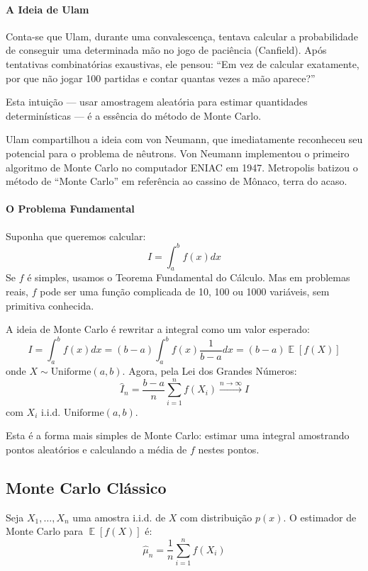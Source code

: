 \documentclass{tufte-handout}
\DeclareMathOperator{\E}{\mathbb{E}}
\begin{document}
\paragraph{A Ideia de Ulam}

Conta-se que Ulam, durante uma convalescença, tentava calcular a probabilidade de
conseguir uma determinada mão no jogo de paciência (Canfield). Após tentativas
combinatórias exaustivas, ele pensou: ``Em vez de calcular exatamente, por que não
jogar 100 partidas e contar quantas vezes a mão aparece?''

Esta intuição --- usar amostragem aleatória para estimar quantidades determinísticas ---
é a essência do método de Monte Carlo.

Ulam compartilhou a ideia com von Neumann, que imediatamente reconheceu seu potencial
para o problema de nêutrons. Von Neumann implementou o primeiro algoritmo de Monte Carlo
no computador ENIAC em 1947. Metropolis batizou o método de ``Monte Carlo'' em referência
ao cassino de Mônaco, terra do acaso.

\paragraph{O Problema Fundamental}

Suponha que queremos calcular:
\[
I = \int_a^b f(x) dx
\]
Se $f$ é simples, usamos o Teorema Fundamental do Cálculo. Mas em problemas reais,
$f$ pode ser uma função complicada de 10, 100 ou 1000 variáveis, sem primitiva conhecida.

A ideia de Monte Carlo é rewritar a integral como um valor esperado:
\[
I = \int_a^b f(x) dx = (b-a) \int_a^b f(x) \frac{1}{b-a} dx = (b-a) \E[f(X)]
\]
onde $X \sim \text{Uniforme}(a, b)$. Agora, pela Lei dos Grandes Números:
\[
\hat{I}_n = \frac{b-a}{n} \sum_{i=1}^n f(X_i) \xrightarrow{n\to\infty} I
\]
com $X_i$ i.i.d. $\text{Uniforme}(a, b)$.

Esta é a forma mais simples de Monte Carlo: estimar uma integral amostrando pontos
aleatórios e calculando a média de $f$ nestes pontos.

\subsection{Monte Carlo Clássico}

\begin{defn}
    Seja $X_1, \dots, X_n$ uma amostra i.i.d. de $X$ com distribuição $p(x)$.
    O estimador de Monte Carlo para $\E[f(X)]$ é:
    \[
    \hat{\mu}_n = \frac{1}{n} \sum_{i=1}^n f(X_i)
    \]
\end{defn}
\end{document}
